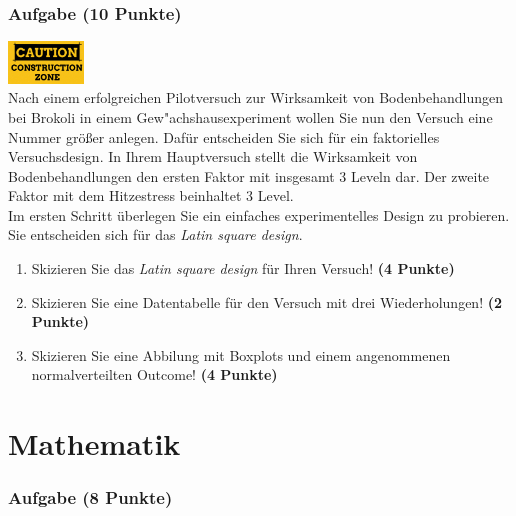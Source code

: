 \documentclass[a4paper, 9pt]{scrartcl}\usepackage[]{graphicx}\usepackage[]{xcolor}
\begin{document}
\section{Aufgabe \hfill (10 Punkte)}

\hfill\href{}{\includegraphics[width =
  2cm]{img/caution}}\\[1Ex]



Nach einem erfolgreichen Pilotversuch zur Wirksamkeit von Bodenbehandlungen bei
Brokoli in einem Gew{"a}chshausexperiment wollen Sie nun den Versuch eine Nummer gr{\"o}{\ss}er
anlegen. Daf{\"u}r entscheiden Sie sich f{\"u}r ein faktorielles Versuchsdesign. In
Ihrem Hauptversuch stellt die Wirksamkeit von Bodenbehandlungen den ersten Faktor
mit insgesamt 3 Leveln dar. Der zweite Faktor mit dem Hitzestress
beinhaltet
3 Level. \\

Im ersten Schritt {\"u}berlegen Sie ein einfaches experimentelles Design zu
probieren. Sie entscheiden sich f{\"u}r das \textit{Latin square design}.

\begin{enumerate}
  \setcounter{enumi}{0}
\item Skizieren Sie das \textit{Latin square design} f{\"u}r Ihren Versuch!
  \textbf{(4 Punkte)}
\item Skizieren Sie eine Datentabelle f{\"u}r den Versuch mit drei
  Wiederholungen! \textbf{(2 Punkte)}
\item Skizieren Sie eine Abbilung mit Boxplots und einem angenommenen
  normalverteilten Outcome! \textbf{(4 Punkte)}
\end{enumerate}


 
\clearpage
\part{Mathematik}

\section{Aufgabe \hfill (8 Punkte)}
\end{document}
